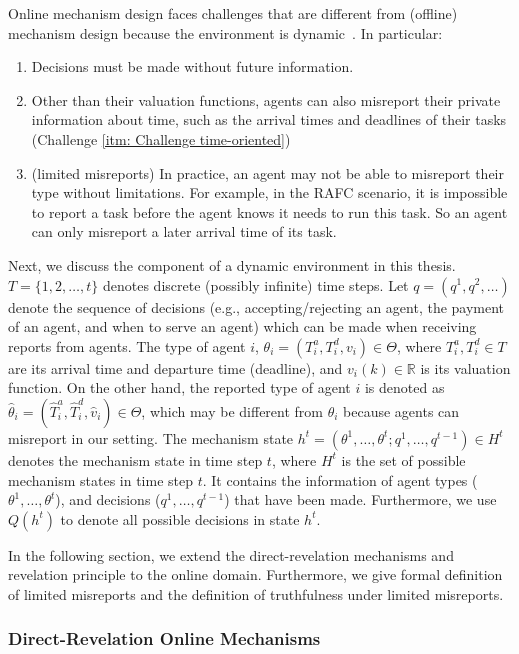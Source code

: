 \documentclass[11pt]{phdthesis}
\begin{document}
Online mechanism design faces challenges that are different from (offline) mechanism design because the environment is dynamic~\citep[Chapter 16]{nisan2007algorithmic}. In particular:
\begin{enumerate}
	\item Decisions must be made without future information.
	\item Other than their valuation functions, agents can also misreport their private information about time, such as the arrival times and deadlines of their tasks (Challenge \ref{itm: Challenge time-oriented})
	\item (limited misreports) In practice, an agent may not be able to misreport their type without limitations. For example, in the RAFC scenario, it is impossible to report a task before the agent knows it needs to run this task. So an agent can only misreport a later arrival time of its task.
\end{enumerate}

Next, we discuss the component of a dynamic environment in this thesis. $T = \{ 1,2,\ldots,t \}$ denotes discrete (possibly infinite) time steps. Let $q = (q^1,q^2,\ldots)$ denote the sequence of decisions (e.g., accepting/rejecting an agent, the payment of an agent, and when to serve an agent) which can be made when receiving reports from agents. The type of agent $ i $, $\theta_i = (T_i^a,T_i^d,v_i) \in \Theta$, where $T_i^a,T_i^d \in T$ are its arrival time and departure time (deadline), and $ v_i(k) \in \mathbb{R} $ is its valuation function. On the other hand, the reported type of agent $ i $ is denoted as $\hat{\theta}_i = (\hat{T}_i^a,\hat{T}_i^d,\hat{v}_i) \in \Theta$, which may be different from $ \theta_{i} $ because agents can misreport in our setting. The mechanism state $h^t = (\theta^1,\ldots, \theta^t; q^1,\ldots,q^{t-1}) \in H^t$ denotes the mechanism state in time step $ t $, where $ H^t $ is the set of possible mechanism states in time step $ t $. It contains the information of agent types ($\theta^1,\ldots, \theta^t$), and decisions ($q^1,\ldots,q^{t-1}$) that have been made. Furthermore, we use $ Q(h^t) $ to denote all possible decisions in state $ h^t $. ~\citep[Section 16.2]{nisan2007algorithmic}

In the following section, we extend the direct-revelation mechanisms and revelation principle to the online domain. Furthermore, we give formal definition of limited misreports and the definition of truthfulness under limited misreports. 

\subsubsection{Direct-Revelation Online Mechanisms} \label{direct-revelation online mechanisms}
\end{document}
